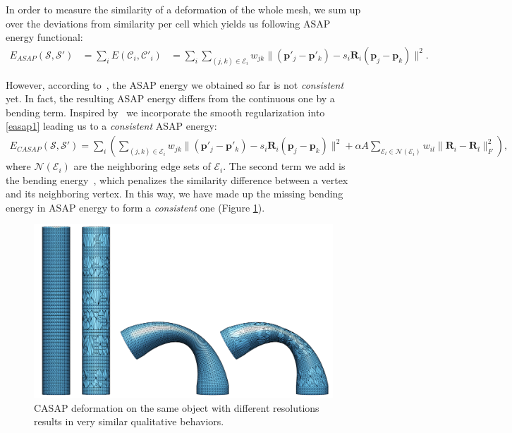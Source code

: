 In order to measure the similarity of a deformation of the whole mesh, we sum up over the deviations from similarity per cell which yields us following ASAP energy functional:
\begin{align}
E_{ASAP}(\mathcal S, \mathcal S')&=\sum_i E(\mathcal  C_i, \mathcal C'_i)&=\displaystyle \sum_i\!\!\sum_{(j,k)\in\mathcal{E}_i}\!\!\!w_{jk}\|(\mathbf p'_j - \mathbf p'_k)\!-\!s_i\!\mathbf R_i(\mathbf p_j - \mathbf p_k)\|^2.\label{easap1}
\end{align}

However, according to~\cite{chao2010simple}, the ASAP energy we obtained so far is not \emph{consistent} yet. In fact, the resulting ASAP energy differs from the continuous one by a bending term. Inspired by~\cite{levi2015smooth} we incorporate the smooth regularization into \eqref{easap1} leading us to a \emph{consistent} ASAP energy:
\begin{align}
E_{\!C\!A\!S\!A\!P\!}(\mathcal S\!,\! \mathcal S'\!)\!\!=\!\!\displaystyle \sum_i\!(\!\!\!\sum_{(j,k)\in\mathcal{E}_i}\!\!\!\!w_{jk}\|(\mathbf p'_j\!\! -\!\! \mathbf p'_k)\!\!-\!\!s_i\!\mathbf R_i(\mathbf p_j - \mathbf p_k)\|^2\!\! +\!\!\alpha A\!\!\!\!\sum_{\mathcal{E}_l \in \mathcal{N}(\mathcal{E}_i)}\!\!\!\!\!\!w_{il}\|\mathbf R_i\!\!-\!\!\mathbf R_l\|_F^2 ),\label{ecasap}
\end{align}
where $\mathcal{N}(\mathcal{E}_i)$ are the neighboring edge sets of $\mathcal{E}_i$. The second term we add is the bending energy~\cite{levi2015smooth}, which penalizes the similarity difference between a vertex and its neighboring vertex. In this way, we have made up the missing bending energy in ASAP energy to form a \emph{consistent} one (Figure \ref{fig:consistent}).
\begin{figure}[h!tb]
	\begin{center}
			\includegraphics[width=0.9\columnwidth]{./figure/consistent_display.png}
	\end{center}
	\caption{CASAP deformation on the same object with different resolutions results in very similar qualitative behaviors.}
	\label{fig:consistent}
\end{figure}

